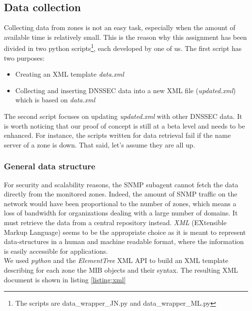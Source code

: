 \subsection{Data collection}
\label{section:data-collection}
Collecting data from zones is not an easy task, especially when the amount of available time is relatively small. This is the reason why this assignment has been divided in two python scripts\footnote{The scripts are data\_wrapper\_JN.py and data\_wrapper\_ML.py}, each developed by one of us. The first script has two purposes:
\begin{itemize}
\item Creating an XML template \textit{data.xml}
\item Collecting and inserting DNSSEC data into a new XML file (\textit{updated.xml}) which is based on \textit{data.xml}
\end{itemize} 

\noindent The second script focuses on updating \textit{updated.xml} with other DNSSEC data. It is worth noticing that our proof of concept is still at a beta level and needs to be enhanced. For instance, the scripts written for data retrieval fail if the name server of a zone is down. That said, let's assume they are all up.

\subsubsection{General data structure}
For security and scalability reasons, the SNMP subagent cannot fetch the data directly from the monitored zones. Indeed, the amount of SNMP traffic on the network would have been proportional to the number of zones, which means a loss of bandwidth for organizations dealing with a large number of domains. It must retrieve the data from a central repository instead. \textit{XML} (EXtensible Markup Language) seems to be the appropriate choice as it is meant to represent data-structures in a human and machine readable format, where the information is easily accessible for applications.
\\
We used \textit{python} and the \textit{ElementTree} XML API\cite{et} to build an XML template describing for each zone the MIB objects and their syntax. The resulting XML document is shown in listing \ref{listing:xml}


